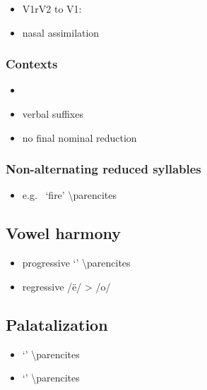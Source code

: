 \documentclass{memoir}
\begin{document}
\begin{itemize}
\tightlist
\item
  V1rV2 to V1:
\item
  nasal assimilation
\end{itemize}

\subsubsection{Contexts}

\begin{itemize}
\item
\item
  verbal suffixes
\item
  no final nominal reduction
\end{itemize}

\subsubsection{Non-alternating reduced syllables}

\begin{itemize}
\tightlist
\item
  e.g.~ `fire' \textbackslash parencites
\end{itemize}

\subsection{\texorpdfstring{Vowel harmony
\label{sec:vowelharm}}{Vowel harmony }}

\begin{itemize}
\tightlist
\item
  progressive  `' \textbackslash parencites
\item
  regressive /ë/ \textgreater{} /o/
\end{itemize}

\subsection{\texorpdfstring{Palatalization
\label{sec:palatalization}}{Palatalization }}

\begin{itemize}
\tightlist
\item
   `' \textbackslash parencites
\item
   `' \textbackslash parencites
\end{itemize}
\end{document}
